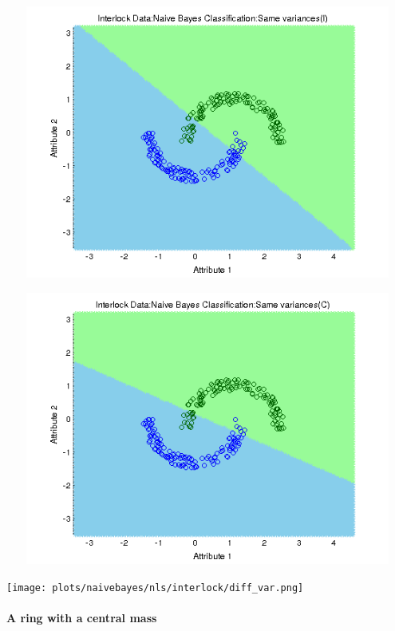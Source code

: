 \documentclass[a4paper]{article}
\begin{document}
		\centerline{\includegraphics[width=160mm,height=90mm]{plots/naivebayes/nls/interlock/identity_var.png}}
		\centerline{\includegraphics[width=160mm,height=90mm]{plots/naivebayes/nls/interlock/same_var.png}}
		\centerline{\texttt{[image: plots/naivebayes/nls/interlock/diff\_var.png]}}
				
		\paragraph{A ring with a central mass}
		
\end{document}
